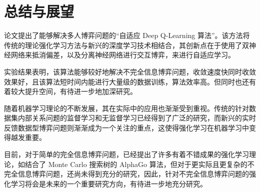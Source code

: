 
\chapter{总结与展望}

论文提出了能够解决多人博弈问题的“自适应 Deep Q-Learning 算法”。该方法将传统的理论强化学习方法与新兴的深度学习技术相结合，其创新点在于使用了双神经网络来抵消偏差，以及分离神经网络进行交互博弈，来进行自适应学习。

实验结果表明，该算法能够较好地解决不完全信息博弈问题，收敛速度快同时收敛效果好，且该算法短时间内能进行大量级的数据训练，算法效率高。但同时也还有着较大提升空间，有待进一步地加深研究。

随着机器学习理论的不断发展，其在实际中的应用也渐渐受到重视。传统的针对数据集内部关系问题的监督学习和无监督学习已经得到了广泛的研究，而新兴的实时反馈数据型博弈问题则渐渐成为一个关注的重点，这使得强化学习在机器学习中变得越发重要。

目前，对于简单的完全信息博弈问题，已经提出了许多有着不错成果的强化学习理论，如结合了 Monte Carlo 搜索树的 AlphaGo 算法\cite{silver2017mastering}，但对于更实际且更复杂的不完全信息博弈问题，还尚未得到充分的研究，因此，针对不完全信息博弈问题的强化学习将会是未来的一个重要研究方向，有待进一步地充分研究。